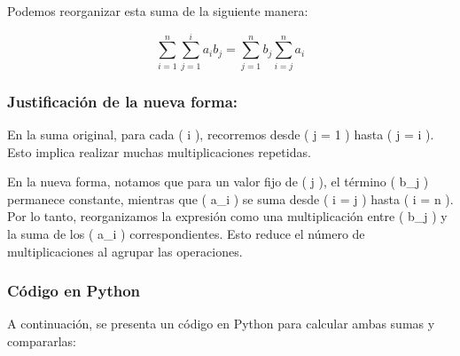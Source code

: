 \documentclass[
  letterpaper,
  DIV=11,
  numbers=noendperiod]{scrartcl}
\begin{document}
Podemos reorganizar esta suma de la siguiente manera:

\[
\sum_{i=1}^{n} \sum_{j=1}^{i} a_i b_j = \sum_{j=1}^{n} b_j \sum_{i=j}^{n} a_i
\]

\subsubsection{Justificación de la nueva
forma:}\label{justificaciuxf3n-de-la-nueva-forma}

En la suma original, para cada ( i ), recorremos desde ( j = 1 ) hasta (
j = i ). Esto implica realizar muchas multiplicaciones repetidas.

En la nueva forma, notamos que para un valor fijo de ( j ), el término (
b\_j ) permanece constante, mientras que ( a\_i ) se suma desde ( i = j
) hasta ( i = n ). Por lo tanto, reorganizamos la expresión como una
multiplicación entre ( b\_j ) y la suma de los ( a\_i )
correspondientes. Esto reduce el número de multiplicaciones al agrupar
las operaciones.

\subsubsection{Código en Python}\label{cuxf3digo-en-python}

A continuación, se presenta un código en Python para calcular ambas
sumas y compararlas:
\end{document}
